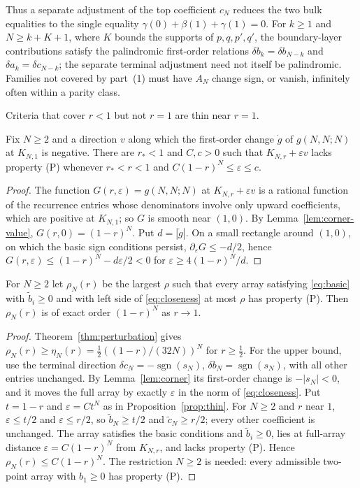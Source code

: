 Thus a separate adjustment of the top coefficient $c_N$ reduces the two bulk equalities to the single equality $\gamma(0)+\beta(1)+\gamma(1)=0$. For $k\geq1$ and $N\geq k+K+1$, where $K$ bounds the supports of $p,q,p',q'$, the boundary-layer contributions satisfy the palindromic first-order relations $\delta b_k=\delta b_{N-k}$ and $\delta a_k=\delta c_{N-k}$; the separate terminal adjustment need not itself be palindromic. Families not covered by part~(1) must have $A_N$ change sign, or vanish, infinitely often within a parity class.

Criteria that cover $r<1$ but not $r=1$ are thin near $r=1$.

\begin{proposition}\label{prop:thin}
Fix $N\geq2$ and a direction $v$ along which the first-order change $\dot g$ of $g(N,N;N)$ at $K_{N,1}$ is negative. There are $r_*<1$ and $C,c>0$ such that $K_{N,r}+\varepsilon v$ lacks property (P) whenever $r_*<r<1$ and $C(1-r)^N\leq\varepsilon\leq c$.
\end{proposition}
\begin{proof}
The function $G(r,\varepsilon)=g(N,N;N)$ at $K_{N,r}+\varepsilon v$ is a rational function of the recurrence entries whose denominators involve only upward coefficients, which are positive at $K_{N,1}$; so $G$ is smooth near $(1,0)$. By Lemma~\ref{lem:corner-value}, $G(r,0)=(1-r)^N$. Put $d=|\dot g|$. On a small rectangle around $(1,0)$, on which the basic sign conditions persist, $\partial_\varepsilon G\leq-d/2$, hence $G(r,\varepsilon)\leq(1-r)^N-d\varepsilon/2<0$ for $\varepsilon\geq4(1-r)^N/d$.
\end{proof}

\begin{corollary}\label{cor:radius-order}
For $N\geq2$ let $\rho_N(r)$ be the largest $\rho$ such that every array satisfying \eqref{eq:basic} with $\widetilde b_i\geq0$ and with left side of \eqref{eq:closeness} at most $\rho$ has property (P). Then $\rho_N(r)$ is of exact order $(1-r)^N$ as $r\to1$.
\end{corollary}
\begin{proof}
Theorem~\ref{thm:perturbation} gives $\rho_N(r)\geq\eta_N(r)=\tfrac12((1-r)/(32N))^N$ for $r\geq\tfrac12$. For the upper bound, use the terminal direction $\delta c_N=-\operatorname{sgn}(s_N)$, $\delta b_N=\operatorname{sgn}(s_N)$, with all other entries unchanged. By Lemma~\ref{lem:corner} its first-order change is $-|s_N|<0$, and it moves the full array by exactly $\varepsilon$ in the norm of \eqref{eq:closeness}. Put $t=1-r$ and $\varepsilon=Ct^N$ as in Proposition~\ref{prop:thin}. For $N\geq2$ and $r$ near $1$, $\varepsilon\leq t/2$ and $\varepsilon\leq r/2$, so $\widetilde b_N\geq t/2$ and $\widetilde c_N\geq r/2$; every other coefficient is unchanged. The array satisfies the basic conditions and $\widetilde b_i\geq0$, lies at full-array distance $\varepsilon=C(1-r)^N$ from $K_{N,r}$, and lacks property (P). Hence $\rho_N(r)\leq C(1-r)^N$. The restriction $N\geq2$ is needed: every admissible two-point array with $b_1\geq0$ has property (P).
\end{proof}


